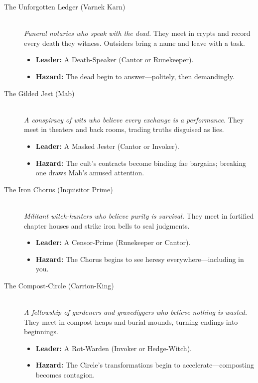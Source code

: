 \begin{description}
\item[The Unforgotten Ledger (Varnek Karn)] \hfill \\
  \textit{Funeral notaries who speak with the dead.} They meet in crypts and record every death they witness. Outsiders bring a name and leave with a task.
  \begin{itemize}
    \item \textbf{Leader:} A Death-Speaker (Cantor or Runekeeper).
    \item \textbf{Hazard:} The dead begin to answer---politely, then demandingly.
  \end{itemize}

\item[The Gilded Jest (Mab)] \hfill \\
  \textit{A conspiracy of wits who believe every exchange is a performance.} They meet in theaters and back rooms, trading truths disguised as lies.
  \begin{itemize}
    \item \textbf{Leader:} A Masked Jester (Cantor or Invoker).
    \item \textbf{Hazard:} The cult's contracts become binding fae bargains; breaking one draws Mab's amused attention.
  \end{itemize}

\item[The Iron Chorus (Inquisitor Prime)] \hfill \\
  \textit{Militant witch-hunters who believe purity is survival.} They meet in fortified chapter houses and strike iron bells to seal judgments.
  \begin{itemize}
    \item \textbf{Leader:} A Censor-Prime (Runekeeper or Cantor).
    \item \textbf{Hazard:} The Chorus begins to see heresy everywhere---including in you.
  \end{itemize}

\item[The Compost-Circle (Carrion-King)] \hfill \\
  \textit{A fellowship of gardeners and gravediggers who believe nothing is wasted.} They meet in compost heaps and burial mounds, turning endings into beginnings.
  \begin{itemize}
    \item \textbf{Leader:} A Rot-Warden (Invoker or Hedge-Witch).
    \item \textbf{Hazard:} The Circle's transformations begin to accelerate---composting becomes contagion.
  \end{itemize}
\end{description}

